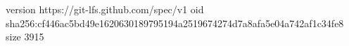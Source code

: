 version https://git-lfs.github.com/spec/v1
oid sha256:cf446ac5bd49e1620630189795194a2519674274d7a8afa5e04a742af1c34fe8
size 3915
